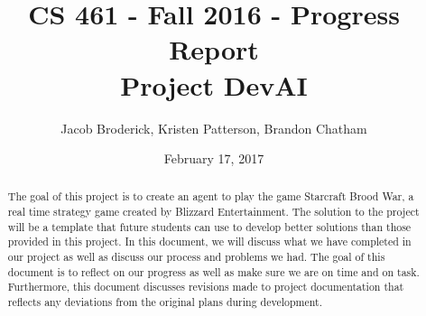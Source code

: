 \documentclass[10pt,letterpaper,onecolumn,draftclsnofoot]{IEEEtran}
\begin{document}
	
	\begin{titlepage}
		
		\title{CS 461 - Fall 2016 - Progress Report \\ Project DevAI}
		\author{Jacob Broderick, Kristen Patterson, Brandon Chatham}
		\date{February 17, 2017}
		\maketitle
		\vspace{4cm}
		\begin{abstract}
			\noindent 
			\noindent
			The goal of this project is to create an agent to play the game Starcraft Brood War, a real time strategy game created by Blizzard Entertainment. The solution to the project will be a template that future students can use to develop better solutions than those provided in this project. In this document, we will discuss what we have completed in our project as well as discuss our process and problems we had. The goal of this document is to reflect on our progress as well as make sure we are on time and on task. Furthermore, this document discusses revisions made to project documentation that reflects any deviations from the original plans during development.
		\end{abstract}
	\end{titlepage}
	
\end{document}

